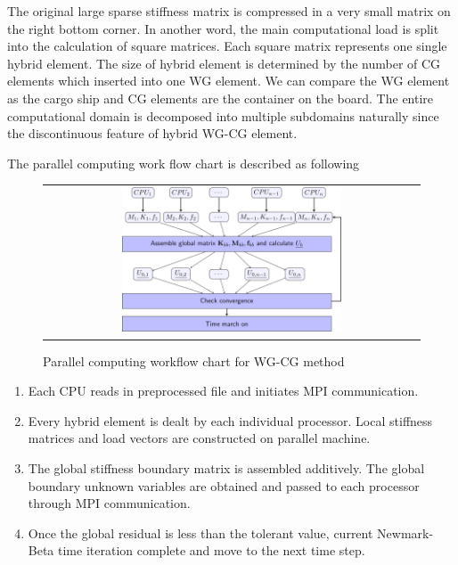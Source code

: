  The original large sparse stiffness matrix is compressed in a very small matrix on the right bottom corner. In another word, the main computational load is split into the calculation of square matrices. Each square matrix represents one single hybrid element. The size of hybrid element is determined by the number of CG elements which inserted into one WG element. We can compare the WG element as the cargo ship and CG elements are the container on the board. The entire computational domain is decomposed into multiple subdomains naturally since the discontinuous feature of hybrid WG-CG element.
  
  The parallel computing work flow chart is described as following
  
    \begin{figure}[h]
    	\centering
    	\begin{tabular}{c}
    		\includegraphics[width=0.6\textwidth]{./pics/flowchart1.png}
    	\end{tabular}
    	\caption{\footnotesize Parallel computing workflow chart for WG-CG method}
    \end{figure}
    
   \begin{enumerate}
   	\item Each CPU reads in preprocessed file and initiates MPI communication\cite{gropp1996high}.
   	\item Every hybrid element is dealt by each individual processor. Local stiffness matrices and load vectors are constructed on parallel machine.
   	\item The global stiffness boundary matrix is assembled additively. The global boundary unknown variables are obtained and passed to each processor through MPI communication.
   	\item Once the global residual is less than the tolerant value, current Newmark-Beta time iteration complete and move to the next time step.
   \end{enumerate}
   
